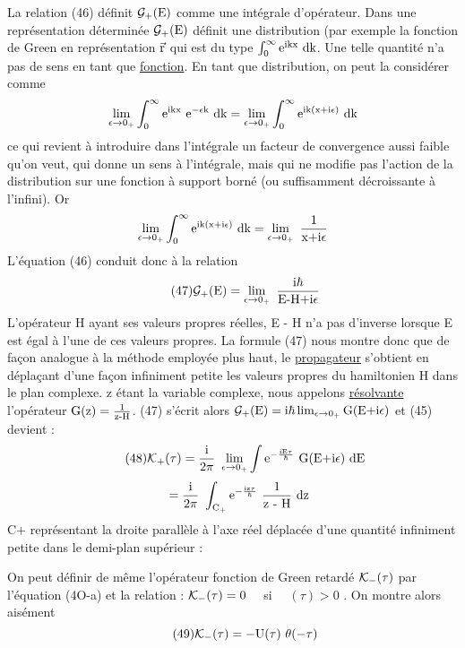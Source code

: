 La relation (46) définit $\mathcal{G}_+(\text{E})$ comme une intégrale d'opérateur. Dans
une représentation déterminée $\mathcal{G}_+(\text{E})$ définit une distribution (par
exemple la fonction de Green en représentation $\vec{\text{r}}$ qui est du type $\int_0^\infty \text{e}^{\text{ikx}}\ \text{dk}$.
Une telle quantité n'a pas de sens en tant que \ul{fonction}. En tant que distribution, on peut la considérer comme
\[
\lim_{\epsilon\to 0_+}\int_0^\infty \text{e}^{\text{ikx}}\ \text{e}^{-\epsilon\text{k}}\ \text{dk} = \lim_{\epsilon\to 0_+}\int_0^\infty \text{e}^{\text{ik(x+i}\epsilon)}\ \text{dk}
\]
ce qui revient à introduire dans l'intégrale un facteur de convergence aussi
faible qu'on veut, qui donne un sens à l'intégrale, mais qui ne modifie pas
l'action de la distribution sur une fonction à support borné (ou suffisamment
décroissante à l'infini).
Or
\[
\lim_{\epsilon\to 0_+}\int_0^\infty \mt{e}^{\mt{ik(x+i}\epsilon)}\ \mt{dk} = \lim_{\epsilon\to 0_+}\ \frac{1}{\mt{x+i}\epsilon}
\]
L'équation (46) conduit donc à la relation
\[
\tag{47}\mc{G}_+(\mt{E})=\lim_{\epsilon\to 0_+}\ \frac{\mt{i}\hbar}{\mt{E-H+i}\epsilon}
\]
L'opérateur H ayant ses valeurs propres réelles, E - H n'a pas d'inverse
lorsque E est égal à l'une de ces valeurs propres. La formule (47) nous
montre donc que de façon analogue à la méthode employée plus haut, le
\ul{propagateur} s'obtient en déplaçant d'une façon infiniment petite les valeurs
propres du hamiltonien H dans le plan complexe. z étant la variable complexe,
nous appelons \ul{résolvante} l'opérateur $\text{G(z)}=\frac{1}{\text{z-H}}$.
(47) s'écrit alors $\mathcal{G}_+(\text{E})=\text{i}\hbar\lim_{\epsilon\to 0_+}\text{G(E+i}\epsilon)$ et
(45) devient :
\[
\tag{48}\mc{K}_+(\tau)=\frac{\mt{i}}{2\pi}\ \lim_{\epsilon\to 0_+}\int\mt{e}^{-\frac{\mt{iE}\tau}{\hbar}}\ \mt{G(E+i}\epsilon)\ \mt{dE}
\]
\[
\ \ \ =\frac{\mt{i}}{2\pi}\ \int_{\mt{C}_+}\mt{e}^{-\frac{\mt{iz}\tau}{\hbar}}\ \frac{1}{\mt{z - H}}\ \mt{dz}
\]
C$+$ représentant la droite parallèle à l'axe réel déplacée d'une quantité
infiniment petite dans le demi-plan supérieur :\begin{center}
 \end{center}

On peut définir de même l'opérateur fonction de Green retardé $\mathcal{K}_-(\tau)$ par
l'équation (4O-a) et la relation : $\mathcal{K}_-(\tau)=0$ \ \ si \ \ $(\tau)>0$ . On montre alors aisément
\[
\tag{49}\mc{K}_-(\tau)=-\mt{U}(\tau)\ \theta(-\tau)
\]

